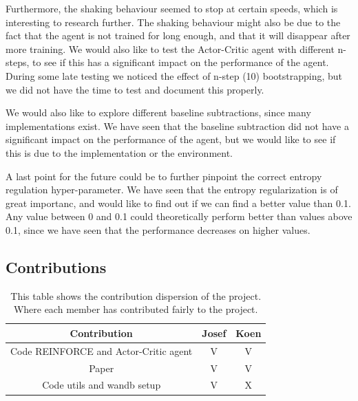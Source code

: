 \documentclass{article}
\begin{document}
Furthermore, the shaking behaviour seemed to stop at certain speeds, which is interesting to research further.
The shaking behaviour might also be due to the fact that the agent is not trained for long enough, and that it will disappear after more training.
We would also like to test the Actor-Critic agent with different n-steps, to see if this has a significant impact on the performance of the agent.
During some late testing we noticed the effect of n-step (10) bootstrapping, but we did not have the time to test and document this properly.

We would also like to explore different baseline subtractions, since many implementations exist.
We have seen that the baseline subtraction did not have a significant impact on the performance of the agent, but we would like to see if this is due to the implementation or the environment.


A last point for the future could be to further pinpoint the correct entropy regulation hyper-parameter.
We have seen that the entropy regularization is of great importanc, and would like to find out  if we can find a better value than 0.1.
Any value between 0 and 0.1 could theoretically perform better than values above 0.1, since we have seen that the performance decreases on higher values.


\subsection{Contributions}
\label{C-Contributes}

\begin{table}[H]
    \centering
    \begin{tabular}{|c|c|c|}
        \hline
        \textbf{Contribution} & \textbf{Josef} & \textbf{Koen} \\
        \hline
    Code REINFORCE and Actor-Critic agent & V              & V             \\
    Paper                                 & V              & V             \\
    Code utils and wandb setup            & V              & X            
    \end{tabular}
    \caption{This table shows the contribution dispersion of the project. Where each member has contributed fairly to the project.  }
    \label{tab:Contribution}
    \end{table}



\end{document}
